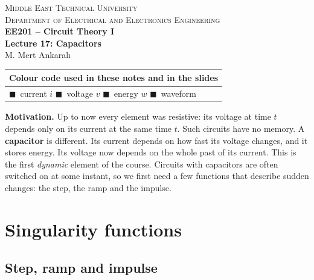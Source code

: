 \documentclass[11pt,a4paper]{article}
\newcommand{\Icol}[1]{\textcolor{ccur}{#1}}
\newcommand{\Vcol}[1]{\textcolor{cvolt}{#1}}
\newcommand{\Pcol}[1]{\textcolor{cpow}{#1}}
\begin{document}
\begin{center}
\begin{tcolorbox}[enhanced, colback=metured!5, colframe=metured, boxrule=1pt,
                  arc=3pt, left=10pt,right=10pt,top=7pt,bottom=7pt, width=\textwidth]
\begin{center}
  {\small\scshape Middle East Technical University}\\[2pt]
  {\small\scshape Department of Electrical and Electronics Engineering}\\[7pt]
  {\Large\bfseries\color{metured} EE201 -- Circuit Theory I}\\[4pt]
  {\large\bfseries Lecture 17: Capacitors}\\[6pt]
  {\small M. Mert Ankaral{\i}}
\end{center}
\end{tcolorbox}
\end{center}
\vspace{-0.5em}

\begin{center}
\small
\begin{tabular}{@{}l@{}}
\toprule
\textbf{Colour code used in these notes and in the slides}\\
\midrule
\Icol{$\blacksquare$}~current $i$ \quad
\Vcol{$\blacksquare$}~voltage $v$ \quad
\Pcol{$\blacksquare$}~energy $w$ \quad
\textcolor{metured}{$\blacksquare$}~waveform\\
\bottomrule
\end{tabular}
\end{center}

\textbf{Motivation.} Up to now every element was resistive: its voltage at time $t$ depends only
on its current at the same time $t$. Such circuits have no memory. A \textbf{capacitor} is
different. Its current depends on how fast its voltage changes, and it stores energy. Its
voltage now depends on the whole past of its current. This is the first \emph{dynamic} element
of the course. Circuits with capacitors are often switched on at some instant, so we first need
a few functions that describe sudden changes: the step, the ramp and the impulse.

\section{Singularity functions}

\subsection{Step, ramp and impulse}
\end{document}
